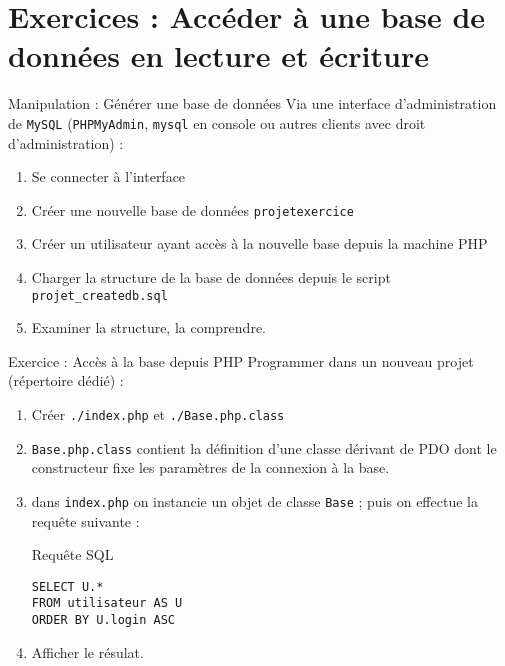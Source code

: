
\section{Exercices : Accéder à une base de données en lecture et écriture}

\begin{frame}[containsverbatim]{Manipulation  : Générer une base de données}
	Via une interface d’administration de \texttt{MySQL} (\texttt{PHPMyAdmin}, \texttt{mysql} en console ou autres clients avec droit d’administration) :
	\begin{enumerate}
		\item Se connecter à l’interface
		\item Créer une nouvelle base de données \texttt{projetexercice}
		\item Créer un utilisateur ayant accès à la nouvelle base depuis la machine PHP
		\item Charger la structure de la base de données depuis le script \texttt{projet\_createdb.sql}
		\item Examiner la structure, la comprendre.
	\end{enumerate}
\end{frame}

\begin{frame}[containsverbatim]{Exercice  : Accès à la base depuis PHP}
	Programmer dans un nouveau projet (répertoire dédié) :
	\begin{enumerate}
		\item Créer \texttt{./index.php} et \texttt{./Base.php.class}
		\item \texttt{Base.php.class} contient la définition d’une classe dérivant de PDO dont le constructeur fixe les paramètres de la connexion à la base.
		\item dans \texttt{index.php} on instancie un objet de classe \texttt{Base} ; puis on effectue la requête suivante :
			\begin{block}{Requête SQL}
				\begin{lstlisting}
SELECT U.*
FROM utilisateur AS U
ORDER BY U.login ASC
			\end{lstlisting}
		\end{block}
		\item  Afficher le résulat.
	\end{enumerate}
\end{frame}
 
